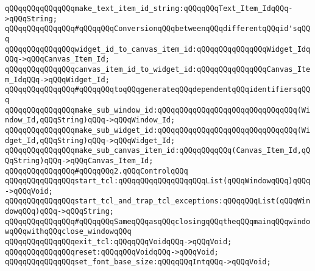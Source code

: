 \verb|qQQqqQQqqQQqqQQqmake_text_item_id_string:qQQqqQQqText_Item_IdqQQq->qQQqString;|\newline
\newline
\verb|qQQqqQQqqQQqqQQq#qQQqqQQqConversionqQQqbetweenqQQqdifferentqQQqid'sqQQq|\newline
\verb|qQQqqQQqqQQqqQQqwidget_id_to_canvas_item_id:qQQqqQQqqQQqqQQqWidget_IdqQQq->qQQqCanvas_Item_Id;|\newline
\verb|qQQqqQQqqQQqqQQqcanvas_item_id_to_widget_id:qQQqqQQqqQQqqQQqCanvas_Item_IdqQQq->qQQqWidget_Id;|\newline
\newline
\verb|qQQqqQQqqQQqqQQq#qQQqqQQqtoqQQqgenerateqQQqdependentqQQqidentifiersqQQq|\newline
\verb|qQQqqQQqqQQqqQQqmake_sub_window_id:qQQqqQQqqQQqqQQqqQQqqQQqqQQqqQQq(Window_Id,qQQqString)qQQq->qQQqWindow_Id;|\newline
\verb|qQQqqQQqqQQqqQQqmake_sub_widget_id:qQQqqQQqqQQqqQQqqQQqqQQqqQQqqQQq(Widget_Id,qQQqString)qQQq->qQQqWidget_Id;|\newline
\verb|qQQqqQQqqQQqqQQqmake_sub_canvas_item_id:qQQqqQQqqQQq(Canvas_Item_Id,qQQqString)qQQq->qQQqCanvas_Item_Id;|\newline
\newline
\newline
\newline
\verb|qQQqqQQqqQQqqQQq#qQQqqQQq2.qQQqControlqQQq|\newline
\newline
\verb|qQQqqQQqqQQqqQQqstart_tcl:qQQqqQQqqQQqqQQqqQQqList(qQQqWindowqQQq)qQQq->qQQqVoid;|\newline
\verb|qQQqqQQqqQQqqQQqstart_tcl_and_trap_tcl_exceptions:qQQqqQQqList(qQQqWindowqQQq)qQQq->qQQqString;|\newline
\newline
\verb|qQQqqQQqqQQqqQQq#qQQqqQQqSameqQQqasqQQqclosingqQQqtheqQQqmainqQQqwindowqQQqwithqQQqclose_windowqQQq|\newline
\verb|qQQqqQQqqQQqqQQqexit_tcl:qQQqqQQqVoidqQQq->qQQqVoid;|\newline
\newline
\verb|qQQqqQQqqQQqqQQqreset:qQQqqQQqVoidqQQq->qQQqVoid;|\newline
\newline
\verb|qQQqqQQqqQQqqQQqset_font_base_size:qQQqqQQqIntqQQq->qQQqVoid;|\newline
\newline
\newline
\newline
